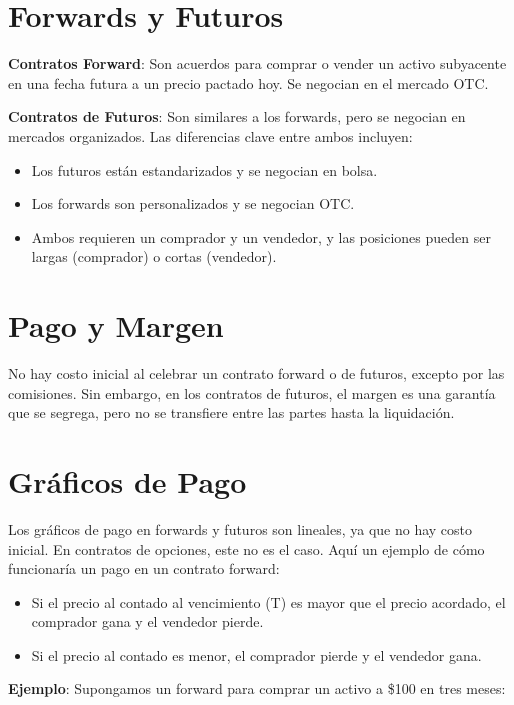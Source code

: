 \documentclass{article}
\begin{document}
\section*{Forwards y Futuros}

\textbf{Contratos Forward}: Son acuerdos para comprar o vender un activo subyacente en una fecha futura a un precio pactado hoy. Se negocian en el mercado OTC.

\textbf{Contratos de Futuros}: Son similares a los forwards, pero se negocian en mercados organizados. Las diferencias clave entre ambos incluyen:

\begin{itemize}
    \item Los futuros están estandarizados y se negocian en bolsa.
    \item Los forwards son personalizados y se negocian OTC.
    \item Ambos requieren un comprador y un vendedor, y las posiciones pueden ser largas (comprador) o cortas (vendedor).
\end{itemize}

\section*{Pago y Margen}

No hay costo inicial al celebrar un contrato forward o de futuros, excepto por las comisiones. Sin embargo, en los contratos de futuros, el margen es una garantía que se segrega, pero no se transfiere entre las partes hasta la liquidación.

\section*{Gráficos de Pago}

Los gráficos de pago en forwards y futuros son lineales, ya que no hay costo inicial. En contratos de opciones, este no es el caso. Aquí un ejemplo de cómo funcionaría un pago en un contrato forward:

\begin{itemize}
    \item Si el precio al contado al vencimiento (T) es mayor que el precio acordado, el comprador gana y el vendedor pierde.
    \item Si el precio al contado es menor, el comprador pierde y el vendedor gana.
\end{itemize}

\textbf{Ejemplo}: Supongamos un forward para comprar un activo a \$100 en tres meses:
\end{document}
